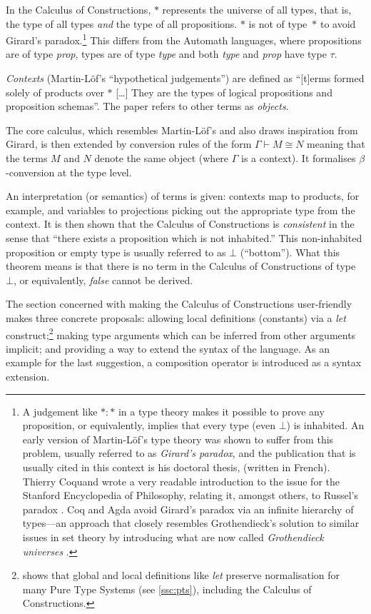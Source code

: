 \documentclass[12pt,toc=bibliography,numbers=noendperiod,
               footnotes=multiple,twoside]{scrartcl}
\begin{document}
In the Calculus of Constructions, \(*\) represents the universe of all types, that is, the type of all types \emph{and} the type of all propositions. \(*\) is not of type~\(*\) to avoid Girard's paradox.\footnote{A judgement like \(* : *\) in a type theory makes it possible to prove any proposition, or equivalently, implies that every type (even \(\bot\)) is inhabited. An early version of Martin-Löf's type theory was shown to suffer from this problem, usually referred to as \emph{Girard's paradox}, and the publication that is usually cited in this context is his doctoral thesis, \textcite{girard_interpretation_1972} (written in French). Thierry Coquand wrote a very readable introduction to the issue for the Stanford Encyclopedia of Philosophy, relating it, amongst others, to Russel's paradox \autocite{coquand_type_2014}. Coq and Agda avoid Girard's paradox via an infinite hierarchy of types---an approach that closely resembles Grothendieck's solution to similar issues in set theory by introducing what are now called \emph{Grothendieck universes} \autocite{artin_orie_1972}.} This differs from the Automath languages, where propositions are of type \textit{prop}, types are of type \textit{type} and both \textit{type} and \textit{prop} have type \(\tau\).

\emph{Contexts} (Martin-Löf's \enquote{hypothetical judgements}) are defined as \enquote{[t]erms formed solely of products over \(*\) [\dots] They are the types of logical propositions and proposition schemas}. The paper refers to other terms as \emph{objects}.

The core calculus, which resembles Martin-Löf's and also draws inspiration from Girard, is then extended by conversion rules of the form \(\Gamma \vdash M \cong N\) meaning that the terms \(M\) and \(N\) denote the same object (where \(\Gamma\) is a context). It formalises \(\beta\)-conversion at the type level.

An interpretation (or semantics) of terms is given: contexts map to products, for example, and variables to projections picking out the appropriate type from the context. It is then shown that the Calculus of Constructions is \emph{consistent} in the sense that \enquote{there exists a proposition which is not inhabited.} This non-inhabited proposition or empty type is usually referred to as \(\bot\) (\enquote{bottom}). What this theorem means is that there is no term in the Calculus of Constructions of type \(\bot\), or equivalently, \emph{false} cannot be derived.

The section concerned with making the Calculus of Constructions user-friendly makes three concrete proposals: allowing local definitions (constants) via a \textit{let} construct;\footnote{\textcite{severi_pure_1994} shows that global and local definitions like \emph{let} preserve normalisation for many Pure Type Systems (see \cref{ssc:pts}), including the Calculus of Constructions.} making type arguments which can be inferred from other arguments implicit; and providing a way to extend the syntax of the language. As an example for the last suggestion, a composition operator is introduced as a syntax extension.
\end{document}
